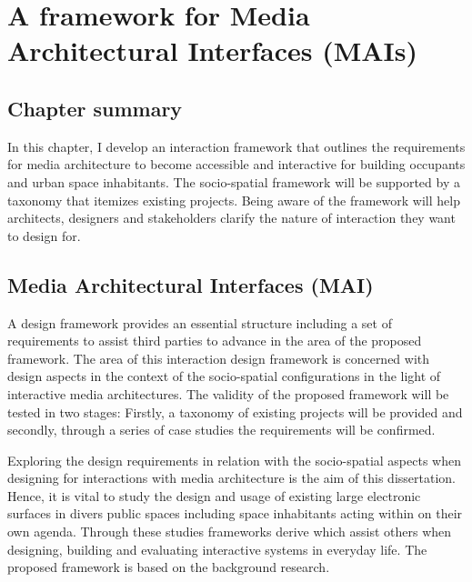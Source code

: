 \chapter{A framework for Media Architectural Interfaces (MAIs)}
\label{chapterlabel4}

\section*{Chapter summary}

In this chapter, I develop an interaction framework that outlines the requirements for media architecture to become accessible and interactive for building occupants and urban space inhabitants. The socio-spatial framework will be supported by a taxonomy that itemizes existing projects. Being aware of the framework will help architects, designers and stakeholders clarify the nature of interaction they want to design for.  

\newpage


\section{ Media Architectural Interfaces (MAI) }


A design framework provides an essential structure including a set of requirements to assist third parties to advance in the area of the proposed framework.
The area of this interaction design framework is concerned with design aspects in the context of the socio-spatial configurations in the light of interactive media architectures. 
The validity of the proposed framework will be tested in two stages: 
Firstly, a taxonomy of existing projects will be provided and secondly, through a series of case studies the requirements will be confirmed. 

Exploring the design requirements in relation with the socio-spatial aspects when designing for interactions with media architecture is the aim of this dissertation. 
Hence, it is vital to study the design and usage of existing large electronic surfaces in divers public spaces including space inhabitants acting within on their own agenda.
Through these studies frameworks derive which assist others when designing, building and evaluating interactive systems in everyday life. 
The proposed framework is based on the background research. 

